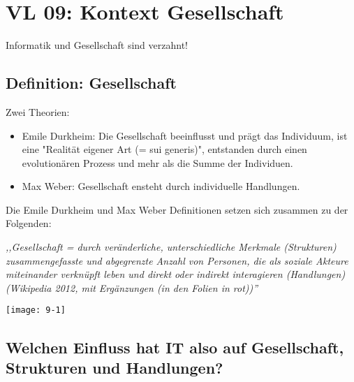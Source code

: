 \section{VL 09: Kontext Gesellschaft}
Informatik und Gesellschaft sind verzahnt!

\subsection{Definition: Gesellschaft}
Zwei Theorien:
\begin{itemize}
	\item Emile Durkheim:
	Die Gesellschaft beeinflusst und prägt das Individuum, ist eine "Realität eigener Art (= sui generis)", entstanden durch einen evolutionären Prozess und mehr als die Summe der Individuen.
	\item Max Weber:
	Gesellschaft ensteht durch individuelle Handlungen.
\end{itemize}
Die Emile Durkheim und Max Weber Definitionen setzen sich zusammen zu der Folgenden:

\emph{,,Gesellschaft = durch veränderliche, unterschiedliche Merkmale (Strukturen)
zusammengefasste und abgegrenzte Anzahl von Personen, die als soziale
Akteure miteinander verknüpft leben und direkt oder indirekt interagieren
(Handlungen) (Wikipedia 2012, mit Ergänzungen (in den Folien in rot))''}


\begin{center}\texttt{[image: 9-1]}\end{center}

\subsection{Welchen Einfluss hat IT also auf Gesellschaft, Strukturen und Handlungen?}

